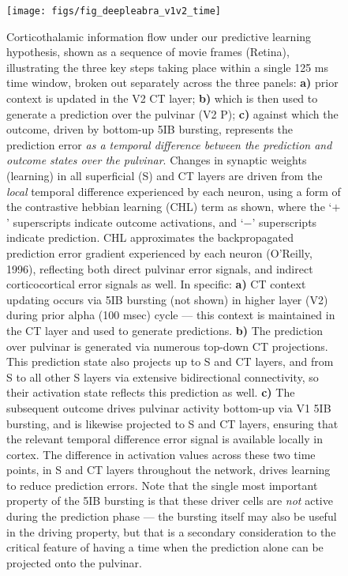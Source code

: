 \documentclass[11pt,twoside]{article}
\newif\myifpdf
\begin{document}
\begin{figure}
  \centering\texttt{[image: figs/fig\_deepleabra\_v1v2\_time]}
  \caption{\footnotesize Corticothalamic information flow under our predictive learning hypothesis, shown as a sequence of movie frames (Retina), illustrating the three key steps taking place within a single 125 ms time window, broken out separately across the three panels: {\bf a)} prior context is updated in the V2 CT layer; {\bf b)} which is then used to generate a prediction over the pulvinar (V2 P); {\bf c)} against which the outcome, driven by bottom-up 5IB bursting, represents the prediction error \emph{as a temporal difference between the prediction and outcome states over the pulvinar}. Changes in synaptic weights (learning) in all superficial (S) and CT layers are driven from the \emph{local} temporal difference experienced by each neuron, using a form of the contrastive hebbian learning (CHL) term as shown, where the `$+$' superscripts indicate outcome activations, and `$-$' superscripts indicate prediction. CHL approximates the backpropagated prediction error gradient experienced by each neuron (O'Reilly, 1996), reflecting both direct pulvinar error signals, and indirect corticocortical error signals as well.  In specific: {\bf a)} CT context updating occurs via 5IB bursting (not shown) in higher layer (V2) during prior alpha (100 msec) cycle --- this context is maintained in the CT layer and used to generate predictions. {\bf b)} The prediction over pulvinar is generated via numerous top-down CT projections. This prediction state also projects up to S and CT layers, and from S to all other S layers via extensive bidirectional connectivity, so their activation state reflects this prediction as well.  {\bf c)} The subsequent outcome drives pulvinar activity bottom-up via V1 5IB bursting, and is likewise projected to S and CT layers, ensuring that the relevant temporal difference error signal is available locally in cortex. The difference in activation values across these two time points, in S and CT layers throughout the network, drives learning to reduce prediction errors.  Note that the single most important property of the 5IB bursting is that these driver cells are \emph{not} active during the prediction phase --- the bursting itself may also be useful in the driving property, but that is a secondary consideration to the critical feature of having a time when the prediction alone can be projected onto the pulvinar.}
  \label{fig.dltime}
\end{figure}
\end{document}
